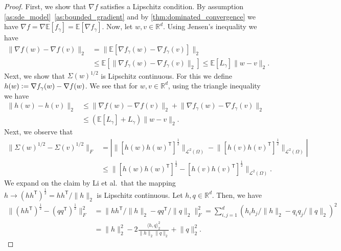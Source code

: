 \documentclass[12pt]{article}
\theoremstyle{definition}
\numberwithin{equation}{section}
\newcommand{\R}{\mathbb{R}}
\newcommand{\CL}{\mathcal{L}}
\newcommand{\T}{\mathsf{T}}
\newcommand{\ev}[1]{\mathbb{E}\left[{#1}\right]}
\newcommand{\norm}[1]{\lVert{#1}\rVert_2}
\newcommand{\normf}[1]{\lVert{#1}\rVert_F}
\newcommand{\norml}[1]{\lVert{#1}\rVert_{\CL^2(\Omega)}}
\newcommand{\scp}[2]{\langle{#1}, {#2}\rangle_2}
\newcommand{\defeq}{\vcentcolon=}
\begin{document}
\begin{proof}
  First, we show that $\nabla f$ satisfies a Lipschitz condition. By assumption \autoref{as:sde_model}~\ref{as:bounded_gradient} and by \autoref{thm:dominated_convergence} we have $\nabla f = \nabla \ev{f_\gamma} = \ev{\nabla f_\gamma}$. Now, let $w,v \in \R^d$. Using Jensen's inequality we have
  \begin{align*}
    \norm{\nabla f(w) - \nabla f(v)} &= \norm{\ev{\nabla f_{\gamma}(w) - \nabla f_{\gamma}(v)}} \\
    &\leq \ev{\norm{\nabla f_{\gamma}(w) - \nabla f_{\gamma}(v)}} 
    \leq \ev{L_{\gamma}}\norm{w-v}.
  \end{align*}
  Next, we show that $\Sigma(w)^{1/2}$ is Lipschitz continuous. For this we define $h(w) \defeq \nabla f_{\gamma}(w) - \nabla f(w)$. We see that for $w,v \in \R^d$, using the triangle inequality we have
  \begin{equation}
    \label{eq:u_lipschitz}
    \begin{split}
      \norm{h(w) - h(v)} &\leq \norm{\nabla f(w) - \nabla f(v)} + \norm{\nabla f_{\gamma}(w) - \nabla f_{\gamma}(v)} \\
      &\leq \left(\ev{L_{\gamma}} + L_{\gamma}\right)\norm{w-v}.  
    \end{split}
  \end{equation}
  Next, we observe that
  \begin{equation}
    \label{eq:sigma_inequality}
    \begin{split}
      \normf{\Sigma(w)^{1/2} - \Sigma(v)^{1/2}} &= \left| \norml{[h(w)h(w)^\T]^{\frac{1}{2}}} - \norml{[h(v)h(v)^\T]^{\frac{1}{2}}} \right| \\
      &\leq \norml{[h(w)h(w)^\T]^{\frac{1}{2}} - [h(v)h(v)^\T]^{\frac{1}{2}}}.
    \end{split}
  \end{equation}
  We expand on the claim by Li et al.\ that the mapping $h \rightarrow (hh^\T)^{\frac{1}{2}} = hh^\T/\norm{h}$ is Lipschitz continuous. Let $h,q \in \R^d$. Then, we have
  \begin{equation}
    \label{eq:mapping_lipschitz}
    \begin{split}
    \normf{(hh^\T)^{\frac{1}{2}} - (qq^\T)^{\frac{1}{2}}}^2 &= \normf{hh^\T/\norm{h} - qq^\T/\norm{q}}^2 = \sum_{i,j = 1}^d (h_ih_j/\norm{h} - q_iq_j/\norm{q})^2 \\
    &= \norm{h}^2 - 2 \frac{\scp{h}{q}^2}{\norm{h}\norm{q}} + \norm{q}^2.

\end{split}
\end{equation}
\end{proof}
\end{document}
